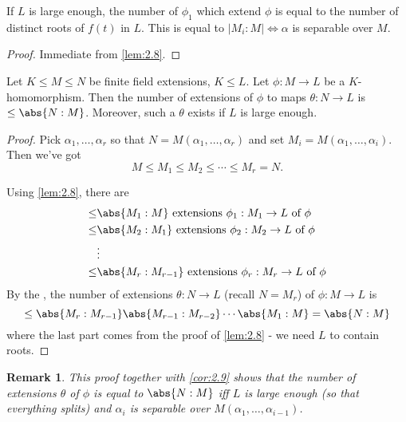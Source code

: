 \documentclass{article}
\newtheorem{nremark}[nthm]{Remark}
\begin{document}
\begin{ncor}\label{cor:2.9}
    If $L$ is large enough, the number of $\phi_1$ which extend $\phi$ is equal to the number of distinct roots of $f(t)$ in $L$. This is equal to $|M_i:M| \iff \alpha$ is separable over $M$.
\end{ncor}

\begin{proof}
    Immediate from \cref{lem:2.8}.
\end{proof}

\begin{ncor}\label{cor:2.10}
    Let $K \leq M \leq N$ be finite field extensions, $K \leq L$. Let $\phi: M \to L$ be a $K$-homomorphism.
    Then the number of extensions of $\phi$ to maps $\theta:N \to L$ is $\leq \abs{N:M}$.
    Moreover, such a $\theta$ exists if $L$ is large enough.
\end{ncor}

\begin{proof}
    Pick $\alpha_1, \dotsc, \alpha_r$ so that $N = M(\alpha_1, \dotsc, \alpha_r)$ and set $M_i = M(\alpha_1, \dotsc,\alpha_i)$. Then we've got
    \begin{equation*}
        M \leq M_1 \leq M_2 \leq \dotsb \leq M_r = N.
    \end{equation*}

    Using \cref{lem:2.8}, there are
    \begin{align*}
        \leq& \abs{M_1:M} \text{ extensions } \phi_1 : M_1 \to L \text{ of } \phi \\
        \leq& \abs{M_2:M_1} \text{ extensions } \phi_2 : M_2 \to L \text{ of } \phi \\
        &\vdots \\
        \leq& \abs{M_r:M_{r-1}} \text{ extensions } \phi_r : M_r \to L \text{ of } \phi
    \end{align*}
    By the , the number of extensions $\theta: N \to L$ (recall $N=M_r$) of $\phi:M \to L$ is
    \begin{equation*}
        \leq \abs{M_r:M_{r-1}} \abs{M_{r-1}:M_{r-2}} \cdots \abs{M_1:M} = \abs{N:M}
    \end{equation*}
    where the last part comes from the proof of \cref{lem:2.8} - we need $L$ to contain roots.
\end{proof}

\begin{nremark}\label{rem:2.11}
    This proof together with \cref{cor:2.9} shows that the number of extensions $\theta$ of $\phi$ is equal to $\abs{N:M}$ iff $L$ is large enough (so that everything splits) and $\alpha_i$ is separable over $M(\alpha_1, \dotsc, \alpha_{i-1})$.
\end{nremark}
\end{document}
